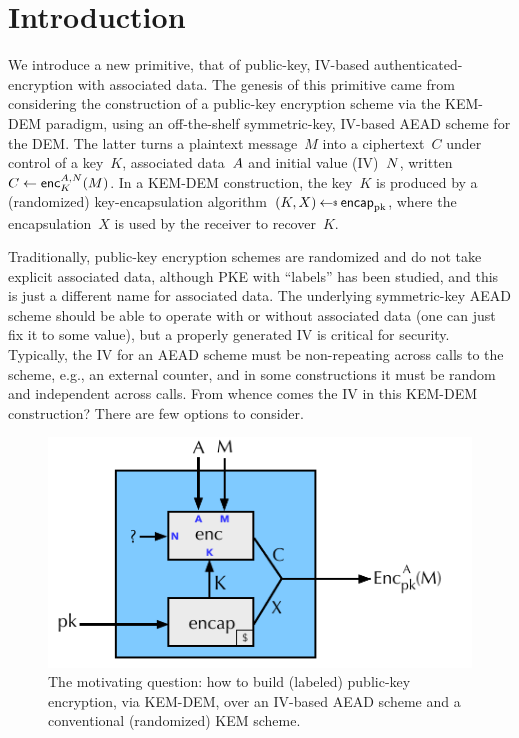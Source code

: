 \section{Introduction}
\label{sec:intro}
We introduce a new primitive, that of public-key, IV-based authenticated-encryption with associated data. The genesis of this primitive came from considering the construction of a public-key encryption scheme via the KEM-DEM paradigm, using an off-the-shelf symmetric-key, IV-based AEAD scheme for the DEM.  The latter turns a plaintext message~$M$ into a ciphertext~$C$ under control of a key~$K$, associated data~$A$ and initial value (IV)~$N$, written $C \gets {\mathsf{enc}}_{K}^{A,N}(M)$.  In a KEM-DEM construction, the key~$K$ is produced by a (randomized) key-encapsulation algorithm~$(K,X)\getsr\encap_\pk$, where the encapsulation~$X$ is used by the receiver to recover~$K$.  

Traditionally, public-key encryption schemes are randomized and do not take explicit associated data, although PKE with ``labels'' has been studied, and this is just a different name for associated data. The underlying symmetric-key AEAD scheme should be able to operate with or without associated data (one can just fix it to some value), but a properly generated IV is critical for security.  Typically, the IV for an AEAD scheme must be non-repeating across calls to the scheme, e.g., an external counter, and in some constructions it must be random and independent across calls. From whence comes the IV in this KEM-DEM construction?  There are few options to consider.  

\begin{figure}[h]
\begin{center}
\includegraphics[scale=1.2]{kem-dem.pdf}
\caption{The motivating question: how to build (labeled) public-key encryption, via KEM-DEM, over an IV-based AEAD scheme and a conventional (randomized) KEM scheme.}
\label{fig:kem-example}
\end{center}
\end{figure}

